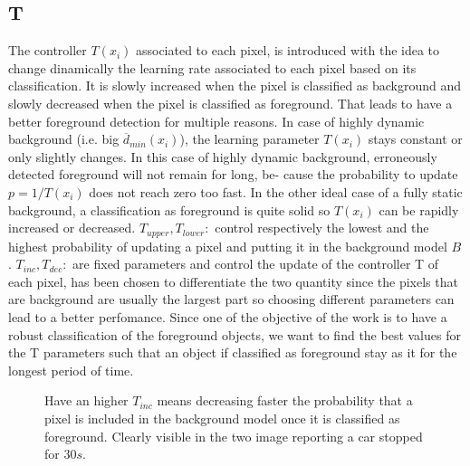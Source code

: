 \subsection*{T}
The controller $T(x_i)$ associated to each pixel, is introduced with the idea to change dinamically the learning rate associated to each pixel based on its classification. It is slowly increased when the pixel is classified as background and slowly decreased when the pixel is classified as foreground. That leads to have a better foreground detection for multiple reasons. \newline
In case of highly dynamic background (i.e. big $\overline{d}_{min}(x_i)$), the learning parameter $T(x_i)$ stays constant or only slightly changes. In this case of highly dynamic background, erroneously detected foreground will not remain for long, be-
cause the probability to update $p = 1/T(x_i)$ does not reach
zero too fast. \newline
In the other ideal case of a fully static background, a classification as foreground is quite solid so $T(x_i)$ can be rapidly increased or decreased. \newline
$T_{upper}, T_{lower}:$ control respectively the lowest and the highest probability of updating a pixel and putting it in the
background model $B$. \newline
$T_{inc}, T_{dec}:$ are fixed parameters and control the update of the controller T of each pixel, has been chosen to differentiate the two quantity since the pixels that are background are usually the largest part so choosing different parameters can lead to a better perfomance.\newline
Since one of the objective of the work is to have a robust classification of the foreground objects, we want to find the best values for the T parameters such that an object if classified as foreground stay as it for the longest period of time. 
\begin{figure}[!t]
    \centering
    \newline
    \caption{Have an higher $T_{inc}$ means decreasing faster the probability that a pixel is included in the background model once it is classified as foreground. Clearly visible in the two image reporting a car stopped for $30s$.}
\end{figure}


